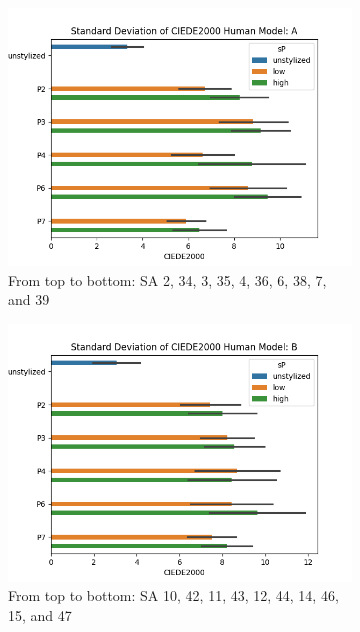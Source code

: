 \begin{figure}[ht]
	\centering
	\begin{subfigure}{0.49\textwidth}
		\includegraphics[width=\linewidth]{Figures/results/good/sd_ciede2000_dora.png}
		\caption{From top to bottom: SA 2, 34, 3, 35, 4, 36, 6, 38, 7, and 39}
	\end{subfigure}
	\begin{subfigure}{0.49\textwidth}
		\includegraphics[width=\linewidth]{Figures/results/good/sd_ciede2000_ephra.png}
		\caption{From top to bottom: SA 10, 42, 11, 43, 12, 44, 14, 46, 15, and 47}
	\end{subfigure}
	\begin{subfigure}{0.49\textwidth}

\end{subfigure}
\end{figure}
